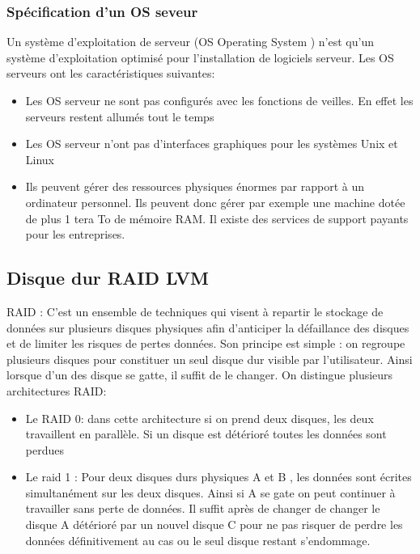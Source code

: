 \documentclass[a4paper,12pt,french]{report} %
\begin{document}
\subsubsection{Spécification d'un OS seveur}
	Un système d'exploitation de serveur (OS Operating System ) n'est qu'un système d'exploitation optimisé pour l'installation de logiciels serveur. Les OS serveurs ont les caractéristiques suivantes:
\begin{itemize}
	\item Les OS serveur ne sont pas configurés avec les fonctions de veilles. En effet les serveurs restent allumés tout le temps
	\item Les OS serveur n'ont pas d'interfaces graphiques pour les systèmes Unix et Linux
	\item Ils peuvent gérer des ressources physiques énormes par rapport à un ordinateur personnel. Ils peuvent donc gérer par exemple une machine dotée de plus 1 tera To de mémoire RAM. Il existe des services de support payants pour les entreprises.
\end{itemize} 
	
\subsection{Disque dur RAID LVM}
RAID : C'est un ensemble de techniques qui visent à repartir le stockage de données sur plusieurs disques physiques afin d'anticiper la défaillance des disques et de limiter les risques de pertes données. Son principe est simple : on regroupe plusieurs disques pour constituer un seul disque dur visible par l'utilisateur. Ainsi lorsque d'un des disque se gatte, il suffit de le changer. On distingue plusieurs architectures RAID:
\begin{itemize}
	\item Le RAID 0: dans cette architecture si on prend deux disques, les deux travaillent en parallèle. Si un disque est détérioré toutes les données sont perdues 
	\item Le raid 1 : Pour deux disques durs physiques A et B , les données sont écrites simultanément sur les deux disques. Ainsi si A se gate on peut continuer à travailler sans perte de données. Il suffit après de changer de changer le disque A détérioré par un nouvel disque C pour ne pas risquer de perdre les données définitivement  au cas ou le seul disque restant s'endommage.
\end{itemize}
\end{document}
